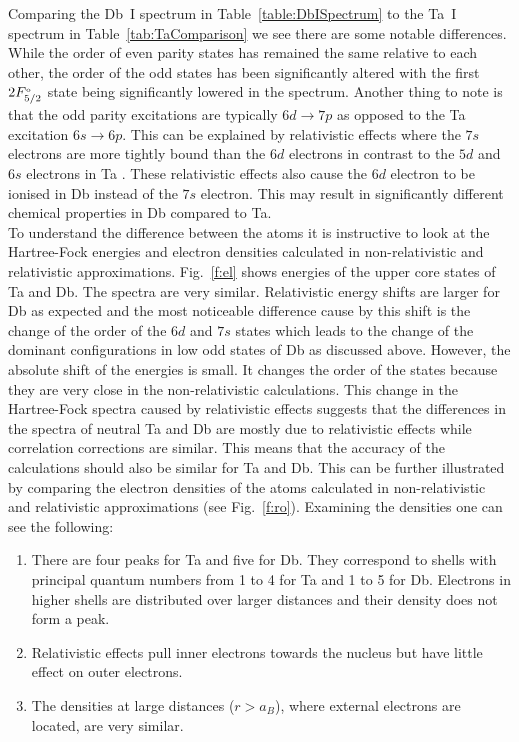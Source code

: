 \documentclass[10pt,a4paper, twoside, openright]{report}
\begin{document}
Comparing the Db~I spectrum in Table~\ref{table:DbISpectrum} to the Ta~I spectrum in Table~\ref{tab:TaComparison} we see there are some notable differences. While the order of even parity states has remained the same relative to each other,  the order of the odd states has been significantly altered with the first $2F^{\rm_o}_{5/2}$ state being significantly lowered in the spectrum. Another thing to note is that the odd parity excitations are typically $6d \rightarrow 7p$ as opposed to the Ta excitation $6s \rightarrow 6p$. This can be explained by relativistic effects where the $7s$ electrons are more tightly bound than the $6d$ electrons in contrast to the $5d$ and $6s$ electrons in Ta \cite{Schwerdtfeger2014}. These relativistic effects also cause the $6d$ electron to be ionised in Db instead of the $7s$ electron. This may result in significantly different chemical properties in Db compared to Ta. \\
\linebreak
To understand the difference between the atoms it is instructive to look at the Hartree-Fock energies and electron 
densities calculated in non-relativistic and relativistic approximations. Fig.~\ref{f:el} shows energies of the upper
core states of Ta and Db. The spectra are very similar. Relativistic energy shifts are larger for Db as expected and
the most noticeable difference cause by this shift is the change of the order of the $6d$ and $7s$ states which leads 
to the  change of the dominant configurations in low odd states of Db as discussed above.  However, the absolute
shift of the energies is small. It changes the order of the states because they are very close in the non-relativistic
calculations. This change in the Hartree-Fock spectra caused by relativistic effects suggests that the differences 
in the spectra of neutral Ta and Db are mostly due to relativistic effects while correlation corrections are
similar. This means that the accuracy of the calculations should also be similar for Ta and Db.
This can be further illustrated by comparing the electron densities of the atoms calculated in non-relativistic and relativistic
approximations (see Fig.~\ref{f:ro}). Examining the densities one can see the following:
\begin{enumerate}
\item There are four peaks for Ta and five for Db. They correspond to shells with principal quantum numbers from 1 to 4 for
Ta and 1 to 5 for Db. Electrons in higher shells are distributed over larger distances and their density does not form a peak.
\item   Relativistic effects pull inner electrons towards the nucleus but have little effect on outer electrons.
\item The densities at large distances ($r>a_B$), where external electrons are located, are very similar.
\end{enumerate}
\end{document}
